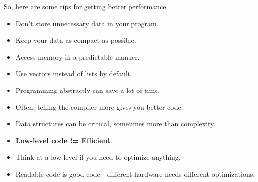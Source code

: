So, here are some tips for getting better performance.
  \begin{itemize}
    \item Don't store unnecessary data in your program.
    \item Keep your data as compact as possible.
    \item Access memory in a predictable manner.
    \item Use vectors instead of lists by default.
    \item Programming abstractly can save a lot of time.
    \item Often, telling the compiler more gives you better code.
    \item Data structures can be critical, sometimes more than complexity.
    \item {\bf Low-level code != Efficient}.
    \item Think at a low level if you need to optimize anything.
    \item Readable code is good code---different hardware needs different
      optimizations.
  \end{itemize}





